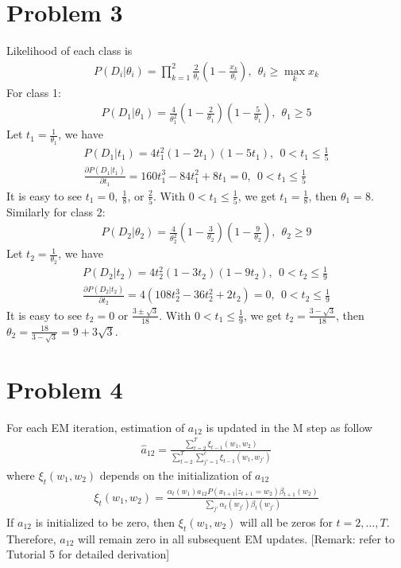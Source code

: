 \documentclass{article}
\begin{document}
\section{Problem 3}
Likelihood of each class is 
\begin{align}
P(D_i|\theta_i) = \prod_{k=1}^2\frac{2}{\theta_i}(1-\frac{x_k}{\theta_i}), ~~\theta_i \geq \max_{k}{x_k}
\end{align}
For class 1:
\begin{align}
P(D_1|\theta_1) = \frac{4}{\theta^2_1}(1-\frac{2}{\theta_1})(1-\frac{5}{\theta_1}), ~~ \theta_1 \geq 5
\end{align}
Let $t_1 = \frac{1}{\theta_1}$, we have
\begin{align}
P(D_1|t_1) = 4t_1^2(1-2t_1)(1-5t_1), ~~ 0 < t_1 \leq \frac{1}{5} \\
\frac{\partial P(D_1|t_1)}{\partial t_1} = 160t_1^3 -84t_1^2 + 8t_1 = 0, ~~ 0 < t_1 \leq \frac{1}{5}
\end{align}
It is easy to see $t_1 = 0, ~\frac{1}{8}$, or $\frac{2}{5}$. With $0 < t_1 \leq \frac{1}{5}$, we get $t_1 = \frac{1}{8}$, then $\theta_1 = 8$.
Similarly for class 2: 
\begin{align}
P(D_2|\theta_2) = \frac{4}{\theta^2_2}(1-\frac{3}{\theta_2})(1-\frac{9}{\theta_2}), ~~ \theta_2 \geq 9
\end{align}
Let $t_2 = \frac{1}{\theta_2}$, we have
\begin{align}
P(D_2|t_2) = 4t_2^2(1-3t_2)(1-9t_2), ~~ 0 < t_2 \leq \frac{1}{9} \\
\frac{\partial P(D_2|t_2)}{\partial t_2} = 4(108t_2^3 -36t_2^2 + 2t_2) = 0, ~~ 0 < t_2 \leq \frac{1}{9}
\end{align}
It is easy to see $t_2 = 0$ or $\frac{3\pm\sqrt{3}}{18}$. With $0 < t_1 \leq \frac{1}{9}$, we get $t_2 = \frac{3-\sqrt{3}}{18}$, then $\theta_2 = \frac{18}{3-\sqrt{3}} = 9+3\sqrt{3}$. \\

\section{Problem 4}
For each EM iteration, estimation of $a_{12}$ is updated in the M step as follow
\begin{align}
\hat{a}_{12} = \frac{\sum_{t=2}^T\xi_{t-1}(w_1, w_2)}{\sum_{t=2}^T\sum_{j'=1}^c\xi_{t-1}(w_1, w_{j'})}
\end{align}
where $\xi_t(w_1, w_2)$ depends on the initialization of $a_{12}$
\begin{align}
\xi_t(w_1, w_2) = \frac{\alpha_t(w_1)a_{12}P(x_{t+1}|z_{t+1}=w_2)\beta_{t+1}(w_2)}{\sum_{j'}\alpha_t(w_{j'})\beta_t(w_{j'})}
\end{align}
If $a_{12}$ is initialized to be zero, then $\xi_t(w_1, w_2)$ will all be zeros for $t=2, \hdots, T$. Therefore, $a_{12}$ will remain zero in all subsequent EM updates. [Remark: refer to Tutorial 5 for detailed derivation]


%
\end{document}
